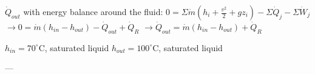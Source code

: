 \( \dot{Q}_{out} \) with energy balance around the fluid:  
\( 0 = \Sigma \dot{m} (h_i + \frac{v^2}{2} + gz_i) - \Sigma \dot{Q}_j - \Sigma \dot{W}_j \)  
\( \rightarrow 0 = \dot{m} (h_{in} - h_{out}) - \dot{Q}_{out} + \dot{Q}_R \)  
\( \rightarrow \dot{Q}_{out} = \dot{m} (h_{in} - h_{out}) + \dot{Q}_R \)  

\( h_{in} = 70^\circ \text{C} \), saturated liquid  
\( h_{out} = 100^\circ \text{C} \), saturated liquid  

---